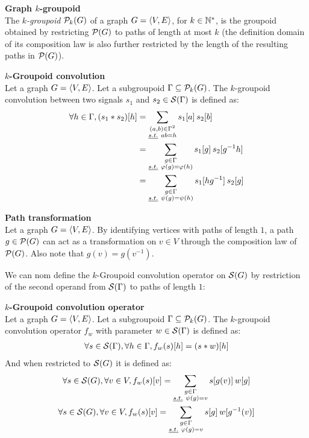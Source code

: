 \begin{definition}\textbf{Graph $k$-groupoid}\\
The \emph{$k$-groupoid} $\cp_k(G)$ of a graph $\gve$, for $k \in \bbn^*$, is the groupoid obtained by restricting $\cp(G)$ to paths of length at most $k$ (the definition domain of its composition law is also further restricted by the length of the resulting paths in $\cp(G)$).
\end{definition}

\begin{definition}\textbf{$k$-Groupoid convolution}\\
Let a graph $\gve$. Let a subgroupoid $\Gamma \subseteq \cp_k(G)$. The $k$-groupoid convolution between two signals $s_1$ and $s_2 \in \cs(\Gamma)$ is defined as:
\begin{align*}
\forall h \in \Gamma, (s_1 \ast s_2) [h] & = \displaystyle \sum_{\substack{(a,b) \in \Gamma^2 \\ \st ab=h }} s_1[a] \h{2} s_2[b] \\
& = \displaystyle \sum_{\substack{g \in \Gamma\\ \st \varphi(g) = \varphi(h)}} s_1[g] \h{2} s_2[g^{-1}h]\\
& = \displaystyle \sum_{\substack{g \in \Gamma\\ \st \psi(g) = \psi(h)}} s_1[hg^{-1}] \h{2} s_2[g]
\end{align*}
\label{def:pconv}
\end{definition}

\begin{claim}\textbf{Path transformation}\\
Let a graph $\gve$. By identifying vertices with paths of length $1$, a path $g \in \cp(G)$ can act as a transformation on $v \in V$ through the composition law of $\cp(G)$. Also note that $g(v) = g(v^{-1})$.
\end{claim}

We can nom define the $k$-Groupoid convolution operator on $\cs(G)$ by restriction of the second operand from $\cs(\Gamma)$ to paths of length $1$:

\begin{definition}\textbf{$k$-Groupoid convolution operator}\\
Let a graph $\gve$. Let a subgroupoid $\Gamma \subseteq \cp_k(G)$. The $k$-groupoid convolution operator $f_w$ with parameter $w \in \cs(\Gamma)$ is defined as:
\begin{gather*}
\forall s \in \cs(\Gamma), \forall h \in \Gamma, f_w(s)[h] = (s \ast w)[h]
\end{gather*}
And when restricted to $\cs(G)$ it is defined as:
\begin{gather*}
\forall s \in \cs(G), \forall v \in V, f_w(s)[v] = \displaystyle \sum_{\substack{g \in \Gamma\\ \st \psi(g) = v}} s[g(v)] \h{2} w[g]\\
\forall s \in \cs(G), \forall v \in V, f_w(s)[v] = \displaystyle \sum_{\substack{g \in \Gamma\\ \st \varphi(g) = v}} s[g] \h{2} w[g^{-1}(v)]
\end{gather*}
\end{definition}

